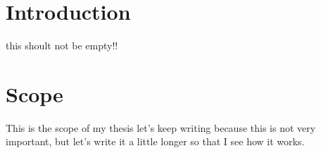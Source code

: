 \chapter{Introduction}

this shoult not be empty!!

\chapter{Scope}

This is the scope of my thesis let's keep writing because this is not very
important, but let's write it a little longer so that I see how it works.
